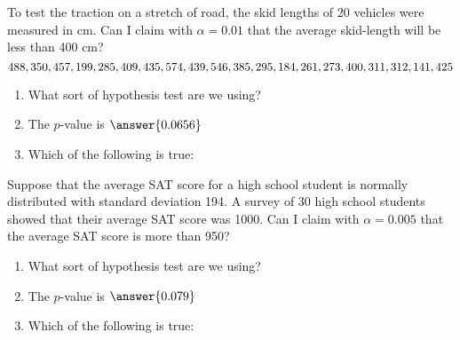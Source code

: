 \documentclass{ximera}
\begin{document}
\begin{problem}
To test the traction on a stretch of road, the skid lengths of 20 vehicles  were measured in cm.  Can I claim with $\alpha=0.01$ that the average skid-length will be less than 400 cm?
$$488, 350, 457, 199, 285, 409, 435, 574, 439, 546,\\
385, 295, 184, 261, 273, 400, 311, 312, 141, 425$$


\begin{enumerate}
\item What sort of hypothesis test are we using?

\begin{multipleChoice}
\end{multipleChoice}

\item The $p$-value is $\answer{0.0656}$

\item Which of the following is true:
\begin{multipleChoice}
\end{multipleChoice}


\end{enumerate}


\end{problem}


\begin{problem}
Suppose that the average SAT score for a high school student is normally distributed  with standard deviation 194.  A survey of 30 high school students showed that their average SAT score was 1000.  Can I claim with $\alpha=0.005$ that the average SAT score is more than 950?

\begin{enumerate}
\item What sort of hypothesis test are we using?

\begin{multipleChoice}
\end{multipleChoice}

\item  The $p$-value is $\answer{0.079}$

\item Which of the following is true:
\begin{multipleChoice}
\end{multipleChoice}

\end{enumerate}


\end{problem}
\end{document}
